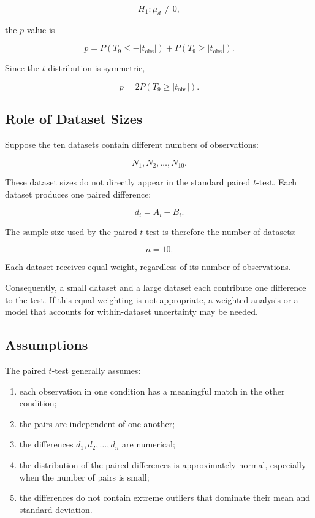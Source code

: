 \documentclass[11pt]{article}
\begin{document}
\[
H_1:\mu_d\neq 0,
\]

the \(p\)-value is

\[
p
=
P(T_9\leq-|t_{\mathrm{obs}}|)
+
P(T_9\geq|t_{\mathrm{obs}}|).
\]

Since the \(t\)-distribution is symmetric,

\[
p=2P(T_9\geq|t_{\mathrm{obs}}|).
\]

\subsection{Role of Dataset Sizes}

Suppose the ten datasets contain different numbers of observations:

\[
N_1,N_2,\ldots,N_{10}.
\]

These dataset sizes do not directly appear in the standard paired
\(t\)-test. Each dataset produces one paired difference:

\[
d_i=A_i-B_i.
\]

The sample size used by the paired \(t\)-test is therefore the number of
datasets:

\[
n=10.
\]

Each dataset receives equal weight, regardless of its number of
observations.

Consequently, a small dataset and a large dataset each contribute one
difference to the test. If this equal weighting is not appropriate, a
weighted analysis or a model that accounts for within-dataset
uncertainty may be needed.

\subsection{Assumptions}

The paired \(t\)-test generally assumes:

\begin{enumerate}[noitemsep]
    \item each observation in one condition has a meaningful match in
    the other condition;

    \item the pairs are independent of one another;

    \item the differences \(d_1,d_2,\ldots,d_n\) are numerical;

    \item the distribution of the paired differences is approximately
    normal, especially when the number of pairs is small;

    \item the differences do not contain extreme outliers that dominate
    their mean and standard deviation.
\end{enumerate}
\end{document}

